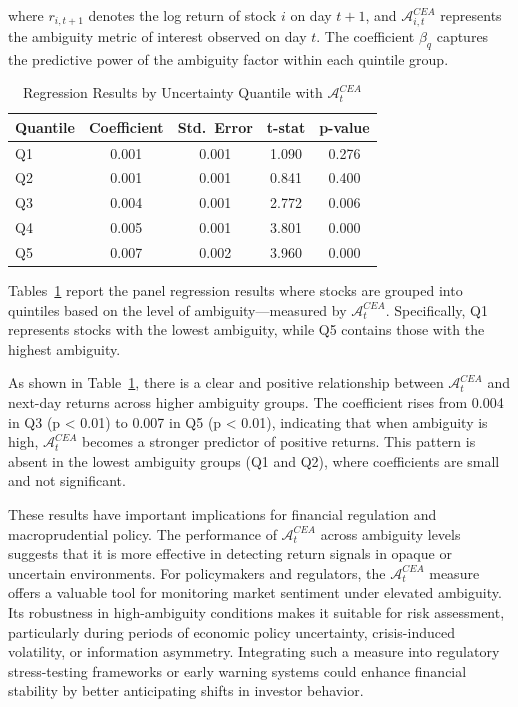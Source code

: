 \documentclass[preprint,12pt,authoryear]{elsarticle}
\begin{document}
where \( r_{i,t+1} \) denotes the log return of stock \( i \) on day \( t+1 \), and \( \mathcal{A}^{CEA}_{i,t} \) represents the ambiguity metric of interest observed on day \( t \). The coefficient \( \beta_q \) captures the predictive power of the ambiguity factor within each quintile group.

\begin{table}[ht]
\centering
\caption{Regression Results by Uncertainty Quantile with \(\mathcal{A}^{CEA}_t\)}
\label{tab:ambmp_results}
\begin{tabularx}{\textwidth}{Xcccc}
\toprule
\textbf{Quantile} & \textbf{Coefficient} & \textbf{Std.\ Error} & \textbf{t-stat} & \textbf{p-value} \\
\midrule
Q1 & 0.001 & 0.001 & 1.090 & 0.276 \\
Q2 & 0.001 & 0.001 & 0.841 & 0.400 \\
Q3 & 0.004 & 0.001 & 2.772 & 0.006 \\
Q4 & 0.005 & 0.001 & 3.801 & 0.000 \\
Q5 & 0.007 & 0.002 & 3.960 & 0.000 \\
\bottomrule
\end{tabularx}
\end{table}

Tables~\ref{tab:ambmp_results} report the panel regression results where stocks are grouped into quintiles based on the level of ambiguity—measured by \(\mathcal{A}^{CEA}_t\). Specifically, Q1 represents stocks with the lowest ambiguity, while Q5 contains those with the highest ambiguity.

As shown in Table~\ref{tab:ambmp_results}, there is a clear and positive relationship between \(\mathcal{A}^{CEA}_t\) and next-day returns across higher ambiguity groups. The coefficient rises from 0.004 in Q3 (p < 0.01) to 0.007 in Q5 (p < 0.01), indicating that when ambiguity is high, \(\mathcal{A}^{CEA}_t\) becomes a stronger predictor of positive returns. This pattern is absent in the lowest ambiguity groups (Q1 and Q2), where coefficients are small and not significant.

These results have important implications for financial regulation and macroprudential policy. The performance of \(\mathcal{A}^{CEA}_t\) across ambiguity levels suggests that it is more effective in detecting return signals in opaque or uncertain environments. For policymakers and regulators, the \(\mathcal{A}^{CEA}_t\) measure offers a valuable tool for monitoring market sentiment under elevated ambiguity. Its robustness in high-ambiguity conditions makes it suitable for risk assessment, particularly during periods of economic policy uncertainty, crisis-induced volatility, or information asymmetry. Integrating such a measure into regulatory stress-testing frameworks or early warning systems could enhance financial stability by better anticipating shifts in investor behavior.
\end{document}

